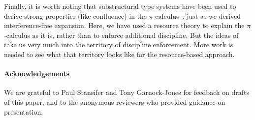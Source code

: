 \documentclass{entcs}
\begin{document}
Finally, it is worth noting that substructural type systems have been
used to derive strong properties (like confluence) in the
$\pi$-calculus~\cite{Kobayashi1999}, just as we derived
interference-free expansion.  Here, we have used a resource theory to
explain the $\pi$-calculus as it is, rather than to enforce additional
discipline.  But the ideas of~ take us very much
into the territory of discipline enforcement.  More work is needed to
see what that territory looks like for the resource-based approach.

\paragraph{Acknowledgements}  We are grateful to Paul Stansifer and 
Tony Garnock-Jones for feedback on drafts of this paper, and to the
anonymous reviewers who provided guidance on presentation.

{} 
\end{document}
